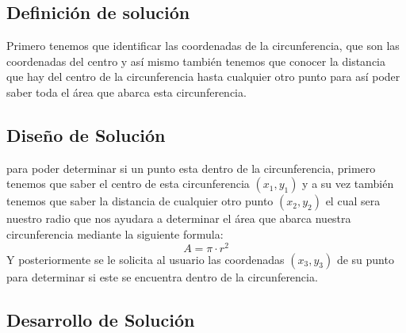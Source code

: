 \subsection{Definición de solución}

Primero tenemos que identificar las coordenadas de la circunferencia, que son las coordenadas del centro y así mismo también tenemos que conocer la distancia que hay del centro de la circunferencia hasta cualquier otro punto para así poder saber toda el área que abarca esta circunferencia.

\subsection{Diseño de Solución}
para poder determinar si un punto esta dentro de la circunferencia, primero tenemos que saber el centro de esta circunferencia $(x_{1}, y_{1})$ y a su vez también tenemos que saber la distancia de cualquier otro punto $(x_{2}, y_{2})$ el cual sera nuestro radio que nos ayudara a determinar el área que abarca nuestra circunferencia mediante la siguiente formula:
\begin{equation}
    A = \pi \cdot r^{2}
\end{equation}
Y posteriormente se le solicita al usuario las coordenadas $(x_{3}, y_{3})$ de su punto para determinar si este se encuentra dentro de la circunferencia.
\subsection{Desarrollo de Solución}

